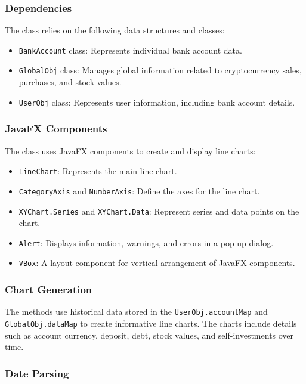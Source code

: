 \documentclass{article}
\begin{document}
\subsubsection{Dependencies}

The class relies on the following data structures and classes:

\begin{itemize}
    \item \texttt{BankAccount} class: Represents individual bank account data.
    \item \texttt{GlobalObj} class: Manages global information related to cryptocurrency sales, purchases, and stock values.
    \item \texttt{UserObj} class: Represents user information, including bank account details.
\end{itemize}

\subsubsection{JavaFX Components}

The class uses JavaFX components to create and display line charts:

\begin{itemize}
    \item \texttt{LineChart}: Represents the main line chart.
    \item \texttt{CategoryAxis} and \texttt{NumberAxis}: Define the axes for the line chart.
    \item \texttt{XYChart.Series} and \texttt{XYChart.Data}: Represent series and data points on the chart.
    \item \texttt{Alert}: Displays information, warnings, and errors in a pop-up dialog.
    \item \texttt{VBox}: A layout component for vertical arrangement of JavaFX components.
\end{itemize}

\subsubsection{Chart Generation}

The methods use historical data stored in the \texttt{UserObj.accountMap} and \texttt{GlobalObj.dataMap} to create informative line charts. The charts include details such as account currency, deposit, debt, stock values, and self-investments over time.

\subsubsection{Date Parsing}
\end{document}
